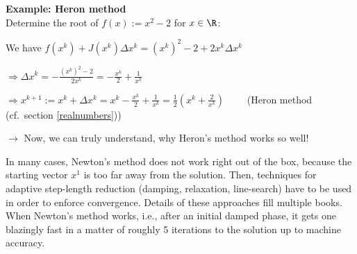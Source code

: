 \newpage
{\bf Example: Heron method} \\[0.5cm]
Determine the root of $f(x):=x^2-2$ for $x\in\R$:
\ite
\item[] We have $f(x^k)+J(x^k)\Delta x^k=(x^k)^2-2+2x^k\Delta x^k$
\item[] $\Rightarrow \Delta x^k=-\frac{(x^k)^2-2}{2x^k}=-\frac{x^k}{2}+\frac{1}{x^k}$
\item[] $\Rightarrow x^{k+1}:=x^k+\Delta x^k=x^k-\frac{x^k}{2}+\frac{1}{x^k}=\frac12\left(x^k+\frac{2}{x^k}\right)$ ~~~~(Heron method (cf.~section \ref{realnumbers}))
\item[] $\rightarrow$ Now, we can truly understand, why Heron's method works so well!
\eti
\vspace{1cm}
\begin{remark} In many cases, Newton's method does not work right out of the box, because the starting vector $x^1$ is too far away from the solution. Then, techniques for adaptive step-length reduction (damping, relaxation, line-search) have to be used in order to enforce convergence. Details of these approaches fill multiple books. When Newton's method works, i.e., after an initial damped phase, it gets one blazingly fast in a matter of roughly 5 iterations to the solution up to machine accuracy.
\end{remark}


%

